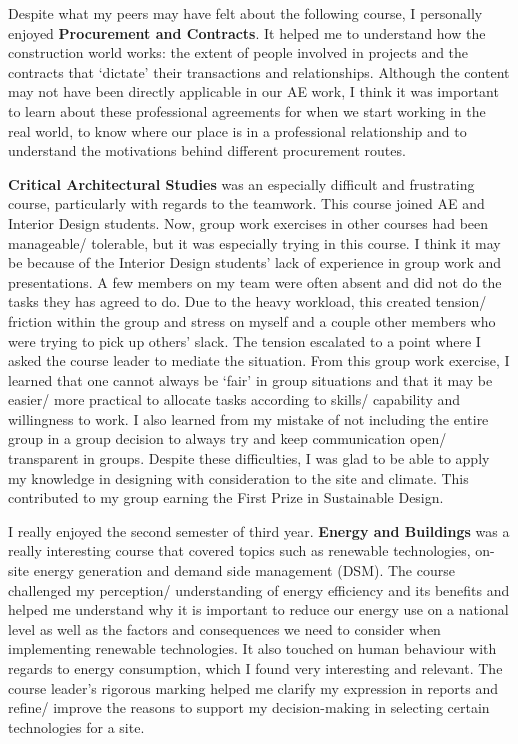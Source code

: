 Despite what my peers may have felt about the following course, I personally enjoyed \textbf{Procurement and Contracts}.
It helped me to understand how the construction world works: the extent of people involved in projects and the contracts that `dictate' their transactions and relationships.
Although the content may not have been directly applicable in our AE work, I think it was important to learn about these professional agreements for when we start working in the real world, to know where our place is in a professional relationship and to understand the motivations behind different procurement routes.

\textbf{Critical Architectural Studies} was an especially difficult and frustrating course, particularly with regards to the teamwork.
This course joined AE and Interior Design students.
Now, group work exercises in other courses had been manageable/ tolerable, but it was especially trying in this course.
I think it may be because of the Interior Design students' lack of experience in group work and presentations.
A few members on my team were often absent and did not do the tasks they has agreed to do.
Due to the heavy workload, this created tension/ friction within the group and stress on myself and a couple other members who were trying to pick up others' slack.
The tension escalated to a point where I asked the course leader to mediate the situation.
From this group work exercise, I learned that one cannot always be `fair' in group situations and that it may be easier/ more practical to allocate tasks according to skills/ capability and willingness to work.
I also learned from my mistake of not including the entire group in a group decision to always try and keep communication open/ transparent in groups.
Despite these difficulties, I was glad to be able to apply my knowledge in designing with consideration to the site and climate.
This contributed to my group earning the First Prize in Sustainable Design.

I really enjoyed the second semester of third year.
\textbf{Energy and Buildings} was a really interesting course that covered topics such as renewable technologies, on-site energy generation and demand side management (DSM).
The course challenged my perception/ understanding of energy efficiency and its benefits and helped me understand why it is important to reduce our energy use on a national level as well as the factors and consequences we need to consider when implementing renewable technologies.
It also touched on human behaviour with regards to energy consumption, which I found very interesting and relevant.
The course leader's rigorous marking helped me clarify my expression in reports and refine/ improve the reasons to support my decision-making in selecting certain technologies for a site.

